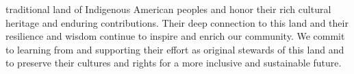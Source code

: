 traditional land of Indigenous American peoples and honor their rich cultural heritage and enduring contributions. Their deep connection to this land and their resilience and wisdom continue to inspire and enrich our community. We commit to learning from and supporting their effort as original stewards of this land and to preserve their cultures and rights for a more inclusive and sustainable future. 

